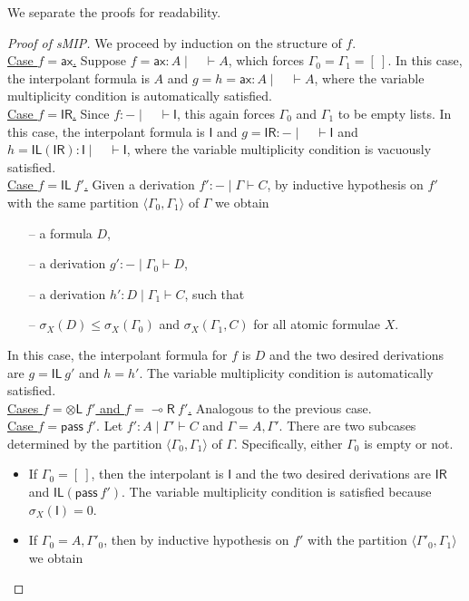 \documentclass[sn-mathphys-num]{sn-jnl}%
\newcommand{\GG}{\Gamma}
\newcommand{\vd}{\vdash}
\newcommand{\tl}{\otimes \mathsf{L}}
\newcommand{\pass}{\mathsf{pass}}
\newcommand{\unitl}{\mathsf{IL}}
\newcommand{\unitr}{\mathsf{IR}}
\newcommand{\ax}{\mathsf{ax}}
\newcommand{\lolli}{\multimap}
\newcommand{\lright}{{\lolli}\mathsf{R}}
\newcommand{\unit}{\mathsf{I}}
\newcommand{\gs}[1]{\sigma_{X} (#1)}
\newcommand{\sMIP}{\textsf{sMIP}}
\theoremstyle{thmstyleone}%
\theoremstyle{thmstyletwo}%
\theoremstyle{thmstylethree}%
\begin{document}
We separate the proofs for readability.
\begin{proof}[Proof of \sMIP]
  We proceed by induction on the structure of $f$. 
  \\
  \underline{Case $f = \ax$.} Suppose $f = \ax : A \mid \quad \vd A$, which forces $\GG_0 = \GG_1 = [\ ]$.
  In this case, the interpolant formula is $A$ and $g = h = \ax : A \mid \quad \vd A$, where the variable multiplicity condition is automatically satisfied.
  \\
  \underline{Case $f = \unitr$.} Since $f : {-} \mid \quad \vd \unit$, this again forces $\GG_0$ and $\GG_1$ to be empty lists.
  In this case, the interpolant formula is $\unit$ and $g =  \unitr : {-} \mid \quad \vd \unit$ and $h = \unitl (\unitr) : \unit \mid \quad \vd \unit$, where the variable multiplicity condition is vacuously satisfied.
  \\
  \underline{Case $f = \unitl \ f'$.}
  Given a derivation $f' : {-} \mid \GG \vd C$, by inductive hypothesis on $f'$ with the same partition $\langle \GG_0, \GG_1 \rangle$ of $\GG$ we obtain  
  \begin{itemize}
    \item[--] a formula $D$,
    \item[--] a derivation $g' : {-} \mid \GG_0 \vd D$,
    \item[--] a derivation $h' : D \mid \GG_1 \vd C$, such that
    \item[--] $\gs{D} \leq \gs{\GG_0}$ and $\gs{\GG_1 , C}$ for all atomic formulae $X$.
  \end{itemize}
  In this case, the interpolant formula for $f$ is $D$ and the two desired derivations are $g = \unitl \ g'$ and $h = h'$.
  The variable multiplicity condition is automatically satisfied.
  \\
  \underline{Cases $f = \tl \ f'$ and $f = \lright \ f'$.} Analogous to the previous case.
  \\
  \underline{Case $f = \pass \ f'$}. Let $f' : A \mid \GG' \vd C$ and $\GG = A,\GG'$.
  There are two subcases determined by the partition $\langle \GG_0,\GG_1 \rangle$ of $\GG$. 
  Specifically, either $\GG_0$ is empty or not.
  \begin{itemize}
    \item If $\GG_0 = [\ ]$, then the interpolant is $\unit$ and the two desired derivations are $\unitr$ and $\unitl (\pass \ f')$.
    The variable multiplicity condition is satisfied because $\gs{\unit} = 0$.
    \item If $\GG_0 = A, \GG'_0$, then by inductive hypothesis on $f'$ with the partition $\langle \GG'_0, \GG_1 \rangle$ we obtain

\end{itemize}
\end{proof}
\end{document}
